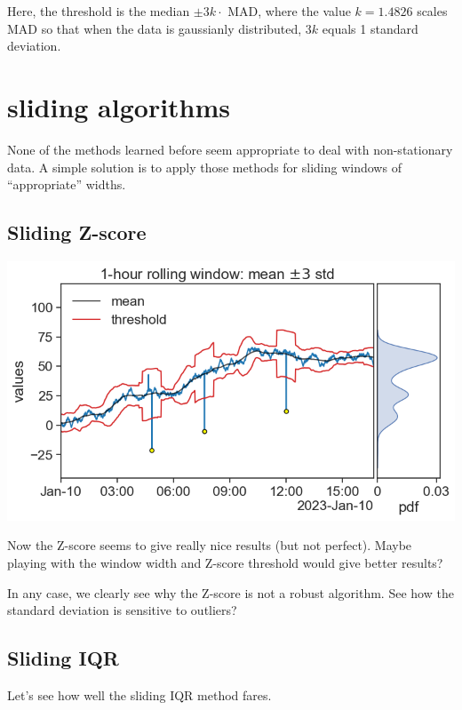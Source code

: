 \documentclass[
  letterpaper,
  DIV=11,
  numbers=noendperiod,
  oneside]{scrreprt}
\begin{document}
Here, the threshold is the median \(\pm3k\cdot\) MAD, where the value
\(k=1.4826\) scales MAD so that when the data is gaussianly distributed,
\(3k\) equals 1 standard deviation.

\hypertarget{sliding-algorithms}{%
\chapter{sliding algorithms}\label{sliding-algorithms}}

None of the methods learned before seem appropriate to deal with
non-stationary data. A simple solution is to apply those methods for
sliding windows of ``appropriate'' widths.

\hypertarget{sliding-z-score}{%
\section{Sliding Z-score}\label{sliding-z-score}}

\includegraphics{outliers/outliers_rolling_3std.png}

Now the Z-score seems to give really nice results (but not perfect).
Maybe playing with the window width and Z-score threshold would give
better results?

In any case, we clearly see why the Z-score is not a robust algorithm.
See how the standard deviation is sensitive to outliers?

\hypertarget{sliding-iqr}{%
\section{Sliding IQR}\label{sliding-iqr}}

Let's see how well the sliding IQR method fares.
\end{document}
